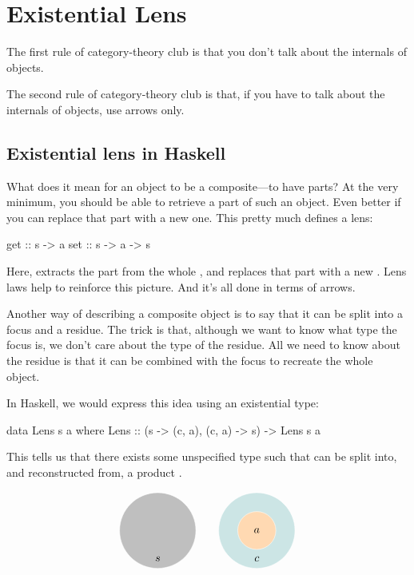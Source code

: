 \documentclass[DaoFP]{subfiles}
\begin{document}
\section{Existential Lens}

The first rule of category-theory club is that you don't talk about the internals of objects.

The second rule of category-theory club is that, if you have to talk about the internals of objects, use arrows only.

\subsection{Existential lens in Haskell}

What does it mean for an object to be a composite---to have parts? At the very minimum, you should be able to retrieve a part of such an object. Even better if you can replace that part with a new one. This pretty much defines a lens:
\begin{haskell}
get :: s -> a
set :: s -> a -> s
\end{haskell}
Here,  extracts the part  from the whole , and  replaces that part with a new . Lens laws help to reinforce this picture. And it's all done in terms of arrows. 

Another way of describing a composite object is to say that it can be split into a focus and a residue. The trick is that, although we want to know what type the focus is, we don't care about the type of the residue. All we need to know about the residue is that it can be combined with the focus to recreate the whole object. 

In Haskell, we would express this idea using an existential type:
\begin{haskell}
data Lens s a where
    Lens :: (s -> (c, a), (c, a) -> s) -> Lens s a
\end{haskell}
This tells us that there exists some unspecified type  such that  can be split into, and reconstructed from, a product . 

\[
\begin{tikzpicture}
\filldraw[fill=gray!50, draw=white] (0, 0) circle (1.2);
\node at (0, -0.9) {$s$};
\end{tikzpicture}
\hspace{20pt}
\begin{tikzpicture}
\filldraw[fill=blue!50!green!20, draw=white] (0, 0) circle (1.2);
\filldraw[fill=orange!30, draw=white] (0, 0) circle (0.6);
\node at (0, 0) {$a$};
\node at (0, -0.9) {$c$};
\end{tikzpicture}
\]
\end{document}
